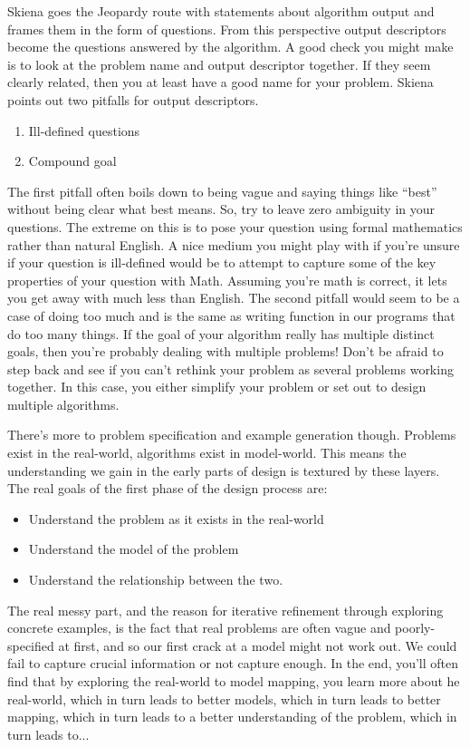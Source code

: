 \documentclass[]{tufte-handout}
\begin{document}
Skiena goes the Jeopardy route with statements about algorithm output and frames them in the form of questions. From this perspective output descriptors become the questions answered by the algorithm. A good check you might make is to look at the problem name and output descriptor together.  If they seem clearly related, then you at least have a good name for your problem. Skiena points out two pitfalls for output descriptors.
\begin{enumerate}
\item Ill-defined questions
\item Compound goal
\end{enumerate}
The first pitfall often boils down to being vague and saying things like ``best'' without being clear what best means. So, try to leave zero ambiguity in your questions.  The extreme on this is to pose your question using formal mathematics rather than natural English.  A nice medium you might play with if you're unsure if your question is ill-defined would be to attempt to capture some of the key properties of your question with Math.  Assuming you're math is correct, it lets you get away with much less than English.  
The second pitfall would seem to be a case of doing too much and is the same as writing function in our programs that do too many things. If the goal of your algorithm really has multiple distinct goals, then you're probably dealing with multiple problems!  Don't be afraid to step back and see if you can't rethink your problem as several problems working together. In this case, you either simplify your problem or set out to design multiple algorithms.  

There's more to problem specification and example generation though. Problems exist in the real-world, algorithms exist in model-world. This means the understanding we gain in the early parts of design is textured by these layers. The real goals of the first phase of the design process are:  
\begin{itemize}
\item Understand the problem as it exists in the real-world
\item Understand the model of the problem  
\item Understand the relationship between the two. 
\end{itemize}
The real messy part, and the reason for iterative refinement through exploring concrete examples, is the fact that real problems are often vague and poorly-specified at first, and so our first crack at a model might not work out.  We could fail to capture crucial information or not capture enough.  In the end, you'll often find that by exploring the real-world to model mapping, you learn more about he real-world, which in turn leads to better models, which in turn leads to better mapping, which in turn leads to a better understanding of the problem, which in turn leads to...
\end{document}
